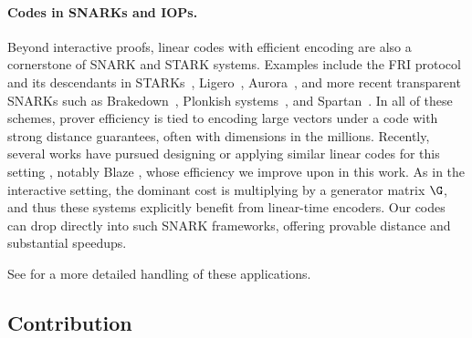 \paragraph{Codes in SNARKs and IOPs.}
Beyond interactive proofs, linear codes with efficient encoding are also a cornerstone of SNARK and STARK systems. Examples include the FRI protocol and its descendants in STARKs~\cite{FRI},  Ligero~\cite{ligero}, Aurora~\cite{aurora}, and more recent transparent SNARKs such as Brakedown~\cite{brakedown}, Plonkish systems~\cite{plonk}, and Spartan~\cite{spartan}. In all of these schemes, prover efficiency is tied to encoding large vectors under a code with strong distance guarantees, often with dimensions in the millions. Recently, several works have pursued designing or applying similar linear codes for this setting \cite{field,liu2025efficient,query},  notably Blaze \cite{blaze}, whose efficiency we improve upon in this work. As in the interactive setting, the dominant cost is multiplying by a generator matrix $\G$, and thus these systems explicitly benefit from linear-time encoders. Our codes can drop directly into such SNARK frameworks, offering provable distance and substantial speedups. 


\medskip

\noindent See  for a more detailed handling of these applications. 

\subsection{Contribution}\label{sec:contrib}

